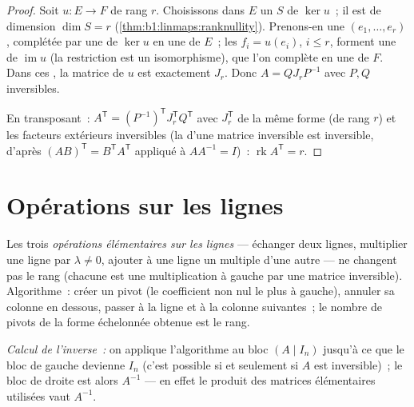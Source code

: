 \begin{proof}
Soit $u \colon E \to F$ de rang $r$. Choisissons dans $E$ un
 $S$ de $\ker u$~; il est de
dimension $\dim S = r$ (\cref{thm:b1:linmaps:ranknullity}). Prenons-en une
$(e_1, \dots, e_r)$, complétée par une  de $\ker u$ en une  de
$E$~; les  $f_i = u(e_i)$, $i \leq r$, forment une  de
$\operatorname{im} u$ (la restriction est un isomorphisme), que l'on
complète en une  de $F$. Dans ces , la matrice de $u$ est
exactement $J_r$. Donc $A = Q J_r P^{-1}$ avec $P, Q$ inversibles.

En transposant~: $A^{\mathsf T} = (P^{-1})^{\mathsf T} J_r^{\mathsf T} Q^{\mathsf T}$
avec $J_r^{\mathsf T}$ de la même forme (de rang $r$) et les facteurs
extérieurs inversibles (la  d'une matrice inversible est
inversible, d'après $(AB)^{\mathsf T} = B^{\mathsf T}A^{\mathsf T}$ appliqué à $AA^{-1} = I$)~:
$\operatorname{rk} A^{\mathsf T} = r$.
\end{proof}

\section{Opérations sur les lignes}

\begin{method}\label{met:b1:matrices:gauss}
Les trois \emph{opérations élémentaires sur les
lignes} --- échanger deux lignes,
multiplier une ligne par $\lambda \neq 0$, ajouter à une ligne un
multiple d'une autre --- ne changent pas le rang (chacune est une
multiplication à gauche par une matrice inversible). Algorithme~: créer
un pivot (le coefficient non nul le plus à gauche), annuler sa colonne
en dessous, passer à la ligne et à la colonne suivantes~; le nombre de
pivots de la forme échelonnée obtenue est le rang.

\emph{Calcul de l'inverse~:} on applique l'algorithme au bloc $(A \mid
I_n)$ jusqu'à ce que le bloc de gauche devienne $I_n$ (c'est possible
si et seulement si $A$ est inversible)~; le bloc de droite est alors
$A^{-1}$ --- en effet le produit des matrices élémentaires utilisées
vaut $A^{-1}$.
\end{method}

